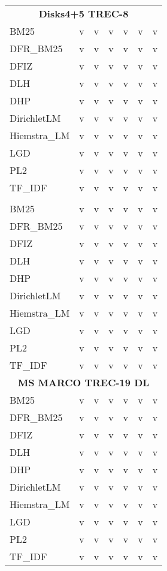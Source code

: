 \begin{longtable}{lcccccc}
    \multicolumn{7}{c}{\textbf{Disks4+5 TREC-8}} \\
    BM25         & v & v & v & v & v & v \\
    DFR\_BM25    & v & v & v & v & v & v \\
    DFIZ         & v & v & v & v & v & v \\
    DLH          & v & v & v & v & v & v \\
    DHP          & v & v & v & v & v & v \\
    DirichletLM  & v & v & v & v & v & v \\
    Hiemstra\_LM & v & v & v & v & v & v \\
    LGD          & v & v & v & v & v & v \\
    PL2          & v & v & v & v & v & v \\
    TF\_IDF      & v & v & v & v & v & v \\
    \midrule

    \pagebreak
    \midrule
    \multicolumn{7}{c}{\textbf{Disks4+5 Robust04}} \\
    BM25         & v & v & v & v & v & v \\
    DFR\_BM25    & v & v & v & v & v & v \\
    DFIZ         & v & v & v & v & v & v \\
    DLH          & v & v & v & v & v & v \\
    DHP          & v & v & v & v & v & v \\
    DirichletLM  & v & v & v & v & v & v \\
    Hiemstra\_LM & v & v & v & v & v & v \\
    LGD          & v & v & v & v & v & v \\
    PL2          & v & v & v & v & v & v \\
    TF\_IDF      & v & v & v & v & v & v \\
    \midrule

    \multicolumn{7}{c}{\textbf{MS MARCO TREC-19 DL}} \\
    BM25         & v & v & v & v & v & v \\
    DFR\_BM25    & v & v & v & v & v & v \\
    DFIZ         & v & v & v & v & v & v \\
    DLH          & v & v & v & v & v & v \\
    DHP          & v & v & v & v & v & v \\
    DirichletLM  & v & v & v & v & v & v \\
    Hiemstra\_LM & v & v & v & v & v & v \\
    LGD          & v & v & v & v & v & v \\
    PL2          & v & v & v & v & v & v \\
    TF\_IDF      & v & v & v & v & v & v \\
    \midrule


\end{longtable}
